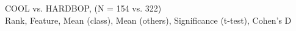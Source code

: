 COOL vs. HARDBOP, (N = 154 vs. 322)\\
Rank, Feature, Mean (class), Mean (others), Significance (t-test), Cohen's D\\
